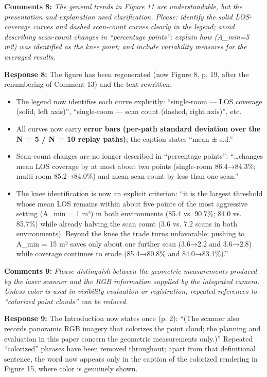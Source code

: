 \documentclass[11pt]{article}
\begin{document}
\medskip

\textbf{Comments 8:} \emph{The general trends in Figure 11 are understandable, but the presentation and explanation need clarification. Please: identify the solid LOS-coverage curves and dashed scan-count curves clearly in the legend; avoid describing scan-count changes in “percentage points”; explain how (A\_min=5 m2) was identified as the knee point; and include variability measures for the averaged results.}

\textbf{Response 8:} The figure has been regenerated (now Figure 8, p. 19, after the renumbering of Comment 13) and the text rewritten:
\begin{itemize}
\item The legend now identifies each curve explicitly: “single-room — LOS coverage (solid, left axis)”, “single-room — scan count (dashed, right axis)”, etc.
\item All curves now carry \textbf{error bars (per-path standard deviation over the N = 5 / N = 10 replay paths)}; the caption states “mean ± s.d.”
\item Scan-count changes are no longer described in “percentage points”: “…changes mean LOS coverage by at most about two points (single-room 86.4→84.3\%; multi-room 85.2→84.0\%) and mean scan count by less than one scan.”
\item The knee identification is now an explicit criterion: “it is the largest threshold whose mean LOS remains within about five points of the most aggressive setting (A\_min = 1 m²) in both environments (85.4 vs. 90.7\%; 84.0 vs. 85.7\%) while already halving the scan count (3.6 vs. 7.2 scans in both environments). Beyond the knee the trade turns unfavorable: pushing to A\_min = 15 m² saves only about one further scan (3.6→2.2 and 3.6→2.8) while coverage continues to erode (85.4→80.8\% and 84.0→83.1\%).”
\end{itemize}

\medskip

\textbf{Comments 9:} \emph{Please distinguish between the geometric measurements produced by the laser scanner and the RGB information supplied by the integrated camera. Unless color is used in visibility evaluation or registration, repeated references to “colorized point clouds” can be reduced.}

\textbf{Response 9:} The Introduction now states once (p. 2): “(The scanner also records panoramic RGB imagery that colorizes the point cloud; the planning and evaluation in this paper concern the geometric measurements only.)” Repeated “colorized” phrases have been removed throughout; apart from that definitional sentence, the word now appears only in the caption of the colorized rendering in Figure 15, where color is genuinely shown.
\end{document}
